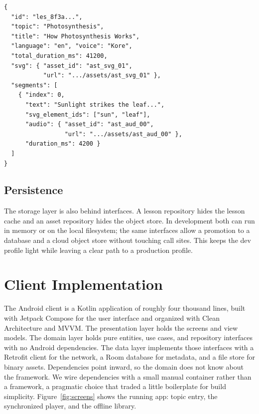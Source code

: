 \documentclass[conference]{IEEEtran}
\begin{document}
\begin{lstlisting}[style=json, caption={The lesson manifest (abridged). Audio is
always a downloadable asset; the SVG may be inlined or referenced.},
label={lst:manifest}]
{
  "id": "les_8f3a...",
  "topic": "Photosynthesis",
  "title": "How Photosynthesis Works",
  "language": "en", "voice": "Kore",
  "total_duration_ms": 41200,
  "svg": { "asset_id": "ast_svg_01",
           "url": ".../assets/ast_svg_01" },
  "segments": [
    { "index": 0,
      "text": "Sunlight strikes the leaf...",
      "svg_element_ids": ["sun", "leaf"],
      "audio": { "asset_id": "ast_aud_00",
                 "url": ".../assets/ast_aud_00" },
      "duration_ms": 4200 }
  ]
}
\end{lstlisting}

\subsection{Persistence}
The storage layer is also behind interfaces. A lesson repository hides the
lesson cache and an asset repository hides the object store. In development both
can run in memory or on the local filesystem; the same interfaces allow a
promotion to a database and a cloud object store without touching call sites.
This keeps the dev profile light while leaving a clear path to a production
profile.

\section{Client Implementation}
\label{sec:client}

The Android client is a Kotlin application of roughly four thousand lines, built
with Jetpack Compose for the user interface and organized with Clean
Architecture and MVVM. The presentation layer holds the screens and view models.
The domain layer holds pure entities, use cases, and repository interfaces with
no Android dependencies. The data layer implements those interfaces with a
Retrofit client for the network, a Room database for metadata, and a file store
for binary assets. Dependencies point inward, so the domain does not know about
the framework. We wire dependencies with a small manual container rather than a
framework, a pragmatic choice that traded a little boilerplate for build
simplicity. Figure~\ref{fig:screens} shows the running app: topic entry, the
synchronized player, and the offline library.
\end{document}
